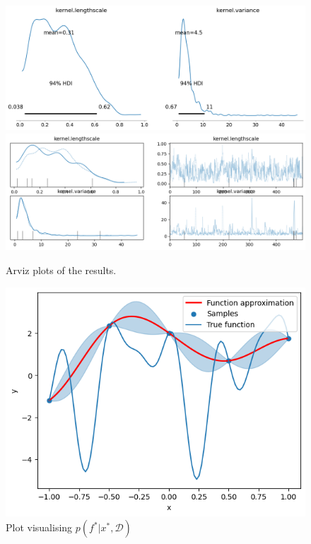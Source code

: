 \begin{figure}[h]
\centering
\includegraphics[width=0.75\linewidth]{images/arviz_single_0.png}\\
\includegraphics[width=0.75\linewidth]{images/arviz_single_1.png}
\setlength{\belowcaptionskip}{-10pt}
\caption{Arviz plots of the results.}
\label{fig:arviz_old}
\end{figure}


\begin{figure}[h]
\centering
\includegraphics[width=0.5\linewidth]{images/f_star.png}
\setlength{\belowcaptionskip}{-10pt}
\caption{Plot visualising $p(f^*|x^*, \mathcal{D})$}
\label{fig:f_star}
\end{figure}
